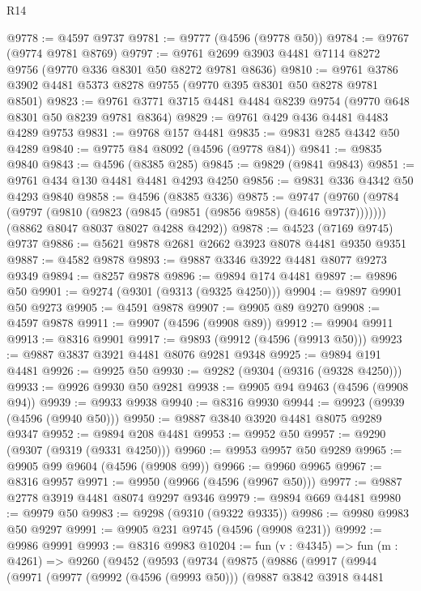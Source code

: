 \begin{lexlean}{R14}
\begin{coremodule}
@9778 := @4597 @9737
@9781 := @9777 (@4596 (@9778 @50))
@9784 := @9767 (@9774 @9781 @8769)
@9797 := @9761 @2699 @3903 @4481 @7114 @8272 @9756 (@9770 @336 @8301 @50 @8272 @9781 @8636)
@9810 := @9761 @3786 @3902 @4481 @5373 @8278 @9755 (@9770 @395 @8301 @50 @8278 @9781 @8501)
@9823 := @9761 @3771 @3715 @4481 @4484 @8239 @9754 (@9770 @648 @8301 @50 @8239 @9781 @8364)
@9829 := @9761 @429 @436 @4481 @4483 @4289 @9753
@9831 := @9768 @157 @4481
@9835 := @9831 @285 @4342 @50 @4289
@9840 := @9775 @84 @8092 (@4596 (@9778 @84))
@9841 := @9835 @9840
@9843 := @4596 (@8385 @285)
@9845 := @9829 (@9841 @9843)
@9851 := @9761 @434 @130 @4481 @4481 @4293 @4250
@9856 := @9831 @336 @4342 @50 @4293 @9840
@9858 := @4596 (@8385 @336)
@9875 := @9747
    (@9760
      (@9784 (@9797 (@9810 (@9823 (@9845 (@9851 (@9856 @9858) (@4616 @9737)))))))
      (@8862 @8047 @8037 @8027 @4288 @4292))
@9878 := @4523 (@7169 @9745) @9737
@9886 := @5621 @9878 @2681 @2662 @3923 @8078 @4481 @9350 @9351
@9887 := @4582 @9878
@9893 := @9887 @3346 @3922 @4481 @8077 @9273 @9349
@9894 := @8257 @9878
@9896 := @9894 @174 @4481
@9897 := @9896 @50
@9901 := @9274 (@9301 (@9313 (@9325 @4250)))
@9904 := @9897 @9901 @50 @9273
@9905 := @4591 @9878
@9907 := @9905 @89 @9270
@9908 := @4597 @9878
@9911 := @9907 (@4596 (@9908 @89))
@9912 := @9904 @9911
@9913 := @8316 @9901
@9917 := @9893 (@9912 (@4596 (@9913 @50)))
@9923 := @9887 @3837 @3921 @4481 @8076 @9281 @9348
@9925 := @9894 @191 @4481
@9926 := @9925 @50
@9930 := @9282 (@9304 (@9316 (@9328 @4250)))
@9933 := @9926 @9930 @50 @9281
@9938 := @9905 @94 @9463 (@4596 (@9908 @94))
@9939 := @9933 @9938
@9940 := @8316 @9930
@9944 := @9923 (@9939 (@4596 (@9940 @50)))
@9950 := @9887 @3840 @3920 @4481 @8075 @9289 @9347
@9952 := @9894 @208 @4481
@9953 := @9952 @50
@9957 := @9290 (@9307 (@9319 (@9331 @4250)))
@9960 := @9953 @9957 @50 @9289
@9965 := @9905 @99 @9604 (@4596 (@9908 @99))
@9966 := @9960 @9965
@9967 := @8316 @9957
@9971 := @9950 (@9966 (@4596 (@9967 @50)))
@9977 := @9887 @2778 @3919 @4481 @8074 @9297 @9346
@9979 := @9894 @669 @4481
@9980 := @9979 @50
@9983 := @9298 (@9310 (@9322 @9335))
@9986 := @9980 @9983 @50 @9297
@9991 := @9905 @231 @9745 (@4596 (@9908 @231))
@9992 := @9986 @9991
@9993 := @8316 @9983
@10204 := fun (v : @4345) =>
  fun (m : @4261) =>
  @9260
    (@9452
      (@9593
        (@9734
          (@9875
            (@9886
              (@9917
                (@9944
                  (@9971
                    (@9977
                      (@9992 (@4596 (@9993 @50)))
                      (@9887
                        @3842
                        @3918
                        @4481

\end{coremodule}
\end{lexlean}
